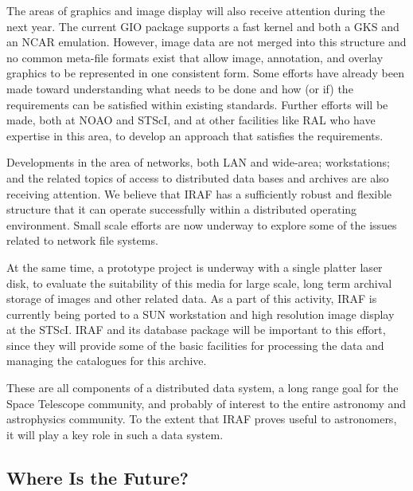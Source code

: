 The areas of graphics and image display will also receive
attention during the next year.  The current GIO package
supports a fast kernel and both a GKS and an NCAR emulation.  
However, image data are not merged into this structure 
and no common meta-file
formats exist that allow image, annotation, and overlay graphics
to be represented in one consistent form.  Some efforts have already
been made toward understanding what needs to be done and how (or if)
the requirements can be satisfied within existing standards.
Further efforts will be made, both at NOAO and STScI, and at
other facilities like RAL who have expertise in this area, to develop
an approach that satisfies the requirements.

Developments in the area of networks, both LAN and wide-area; workstations;
and the related topics of access to distributed data bases and archives
are also receiving attention.  We believe that IRAF
has a sufficiently robust and flexible structure that it can operate
successfully within a distributed operating environment.  Small scale 
efforts are now underway to explore some of the issues related to network
file systems.  

At the same time, a prototype project is underway with a
single platter laser disk, to evaluate the suitability of this media 
for large scale, long term archival storage of images and other related 
data.   As a part of this activity, IRAF is currently
being ported to a SUN workstation and high resolution image display 
at the STScI.  IRAF and its database package will be important 
to this effort, since they will provide some of the basic facilities 
for processing the data and managing the catalogues for this archive. 

These are all components of a distributed data system, a long range goal
for the Space Telescope community, and probably of interest to the entire 
astronomy and astrophysics community.  To the extent that IRAF proves
useful to astronomers, it will play a key role in such a data system.

\subsection{Where Is the Future?}

